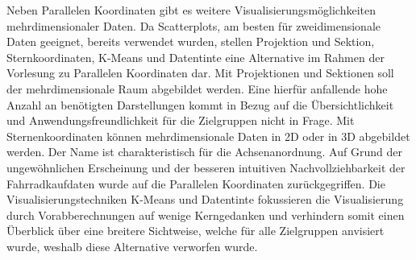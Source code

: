 \documentclass[usegeometry=true]{scrartcl}
\begin{document}
Neben Parallelen Koordinaten gibt es weitere Visualisierungsmöglichkeiten mehrdimensionaler Daten. Da Scatterplots, am besten für zweidimensionale Daten geeignet, bereits verwendet wurden, stellen Projektion und Sektion, Sternkoordinaten, K-Means und Datentinte eine Alternative im Rahmen der Vorlesung zu Parallelen Koordinaten dar. Mit Projektionen und Sektionen soll der mehrdimensionale Raum abgebildet werden. Eine hierfür anfallende hohe Anzahl an benötigten Darstellungen kommt in Bezug auf die Übersichtlichkeit und Anwendungsfreundlichkeit für die Zielgruppen nicht in Frage. Mit Sternenkoordinaten können mehrdimensionale Daten in 2D oder in 3D abgebildet werden. Der Name ist charakteristisch für die Achsenanordnung. Auf Grund der ungewöhnlichen Erscheinung und der besseren intuitiven Nachvollziehbarkeit der Fahrradkaufdaten wurde auf die Parallelen Koordinaten zurückgegriffen. Die Visualisierungstechniken K-Means und Datentinte fokussieren die Visualisierung durch Vorabberechnungen auf wenige Kerngedanken und verhindern somit einen Überblick über eine breitere Sichtweise, welche für alle Zielgruppen anvisiert wurde, weshalb diese Alternative verworfen wurde.
\end{document}
